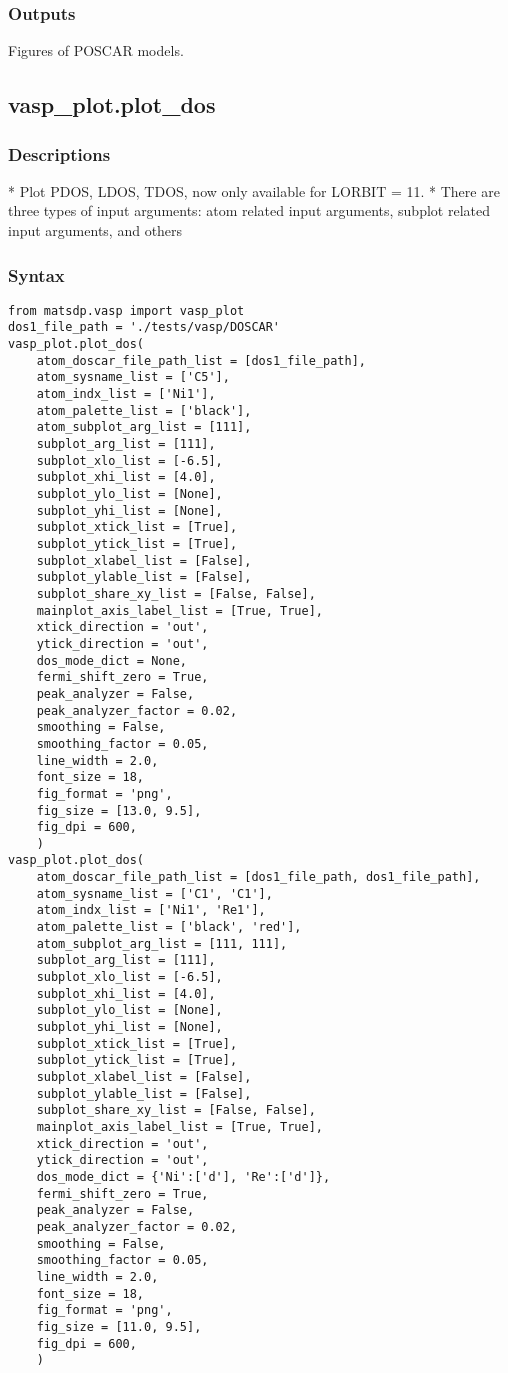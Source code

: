 \documentclass[12pt]{book}
\begin{document}
\subsubsection{Outputs}
Figures of POSCAR models. 

\subsection{vasp\_plot.plot\_dos}

\subsubsection{Descriptions}
 * Plot PDOS, LDOS, TDOS, now only available for LORBIT = 11.
 * There are three types of input arguments: atom related input arguments, subplot related input arguments, and others

\subsubsection{Syntax}
\begin{lstlisting}
from matsdp.vasp import vasp_plot
dos1_file_path = './tests/vasp/DOSCAR'
vasp_plot.plot_dos(
    atom_doscar_file_path_list = [dos1_file_path],
    atom_sysname_list = ['C5'],
    atom_indx_list = ['Ni1'],
    atom_palette_list = ['black'],
    atom_subplot_arg_list = [111],
    subplot_arg_list = [111],
    subplot_xlo_list = [-6.5],
    subplot_xhi_list = [4.0],
    subplot_ylo_list = [None],
    subplot_yhi_list = [None],
    subplot_xtick_list = [True],
    subplot_ytick_list = [True],
    subplot_xlabel_list = [False],
    subplot_ylable_list = [False],
    subplot_share_xy_list = [False, False],
    mainplot_axis_label_list = [True, True],
    xtick_direction = 'out',
    ytick_direction = 'out',
    dos_mode_dict = None,
    fermi_shift_zero = True,
    peak_analyzer = False,
    peak_analyzer_factor = 0.02,
    smoothing = False,
    smoothing_factor = 0.05,
    line_width = 2.0,
    font_size = 18,
    fig_format = 'png',
    fig_size = [13.0, 9.5],
    fig_dpi = 600,
    )
vasp_plot.plot_dos(
    atom_doscar_file_path_list = [dos1_file_path, dos1_file_path],
    atom_sysname_list = ['C1', 'C1'],
    atom_indx_list = ['Ni1', 'Re1'],
    atom_palette_list = ['black', 'red'],
    atom_subplot_arg_list = [111, 111],
    subplot_arg_list = [111],
    subplot_xlo_list = [-6.5],
    subplot_xhi_list = [4.0],
    subplot_ylo_list = [None],
    subplot_yhi_list = [None],
    subplot_xtick_list = [True],
    subplot_ytick_list = [True],
    subplot_xlabel_list = [False],
    subplot_ylable_list = [False],
    subplot_share_xy_list = [False, False],
    mainplot_axis_label_list = [True, True],
    xtick_direction = 'out',
    ytick_direction = 'out',
    dos_mode_dict = {'Ni':['d'], 'Re':['d']},
    fermi_shift_zero = True,
    peak_analyzer = False,
    peak_analyzer_factor = 0.02,
    smoothing = False,
    smoothing_factor = 0.05,
    line_width = 2.0,
    font_size = 18,
    fig_format = 'png',
    fig_size = [11.0, 9.5],
    fig_dpi = 600,
    )
\end{lstlisting}
\end{document}

